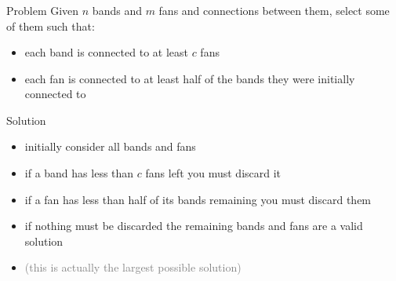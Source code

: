 \begin{frame}
    \frametitle{\problemtitle}
    \begin{block}{Problem}
    	Given $n$ bands and $m$ fans and connections between them, select some of them such that:
    	\begin{itemize}
    		\item each band is connected to at least $c$ fans
    		\item each fan is connected to at least half of the bands they were initially connected to
    	\end{itemize}
    \end{block}
    \pause
    \begin{block}{Solution}
    	\begin{itemize}
    		\item initially consider all bands and fans
    		\pause
    		\item if a band has less than $c$ fans left you must discard it
    		\item if a fan has less than half of its bands remaining you must discard them
    		\pause
    		\item if nothing must be discarded the remaining bands and fans are a valid solution
    		\pause
    		\item[] \textcolor{gray}{(this is actually the largest possible solution)}
    	\end{itemize}
    \end{block}
\end{frame}
